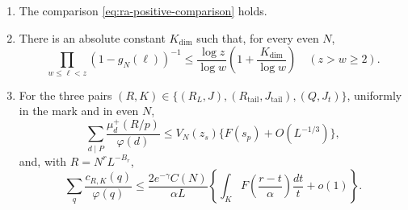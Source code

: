 \begin{lemma}\label{lem:ra-upper-sieve}
\begin{enumerate}
 \item[(a)] The comparison \eqref{eq:ra-positive-comparison} holds.
 \item[(b)] There is an absolute constant \(K_{\mathrm{dim}}\) such that,
 for every even \(N\),
 \begin{equation}\label{eq:ra-product-condition}
  \prod_{w\le\ell<z}(1-g_N(\ell))^{-1}
  \le\frac{\log z}{\log w}\left(1+\frac{K_{\mathrm{dim}}}{\log w}\right)
  \quad(z>w\ge2).
 \end{equation}
 \item[(c)] For the three pairs
 \((R,K)\in\{(R_L,J),(R_{\mathrm{tail}},J_{\mathrm{tail}}),(Q,J_t)\}\),
 uniformly in the mark and in even \(N\),
 \begin{equation}\label{eq:ra-finite-density}
  \sum_{d\mid P}\frac{\mu_d^+(R/p)}{\varphi(d)}
  \le V_N(z_s)\{F(s_p)+O(L^{-1/3})\},
 \end{equation}
 and, with \(R=N^rL^{-B_r}\),
 \begin{equation}\label{eq:ra-mark-density}
  \sum_q\frac{c_{R,K}(q)}{\varphi(q)}
  \le\frac{2e^{-\gamma}C(N)}{\alpha L}
  \left\{\int_K F\left(\frac{r-t}{\alpha}\right)\frac{dt}{t}+o(1)\right\}.
 \end{equation}
\end{enumerate}
\end{lemma}
